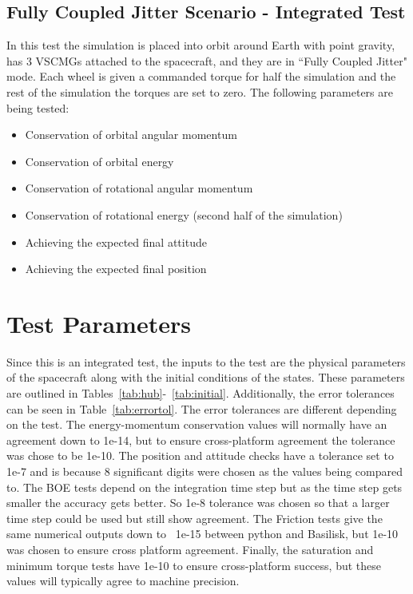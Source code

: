 \subsection{Fully Coupled Jitter Scenario - Integrated Test}
In this test the simulation is placed into orbit around Earth with point gravity, has 3 VSCMGs attached to the spacecraft, and they are in ``Fully Coupled Jitter" mode. Each wheel is given a commanded torque for half the simulation and the rest of the simulation the torques are set to zero. The following parameters are being tested:
\begin{itemize}
\item Conservation of orbital angular momentum
\item Conservation of orbital energy
\item Conservation of rotational angular momentum
\item Conservation of rotational energy (second half of the simulation)
\item Achieving the expected final attitude
\item Achieving the expected final position
\end{itemize}

\section{Test Parameters}

Since this is an integrated test, the inputs to the test are the physical parameters of the spacecraft along with the initial conditions of the states. These parameters are outlined in Tables~\ref{tab:hub}-~\ref{tab:initial}. Additionally, the error tolerances can be seen in Table~\ref{tab:errortol}. The error tolerances are different depending on the test. The energy-momentum conservation values will normally have an agreement down to 1e-14, but to ensure cross-platform agreement the tolerance was chose to be 1e-10. The position and attitude checks have a tolerance set to 1e-7 and is because 8 significant digits were chosen as the values being compared to. The BOE tests depend on the integration time step but as the time step gets smaller the accuracy gets better. So 1e-8 tolerance was chosen so that a larger time step could be used but still show agreement. The Friction tests give the same numerical outputs down to ~1e-15 between python and Basilisk, but 1e-10 was chosen to ensure cross platform agreement. Finally, the saturation and minimum torque tests have 1e-10 to ensure cross-platform success, but these values will typically agree to machine precision. 

